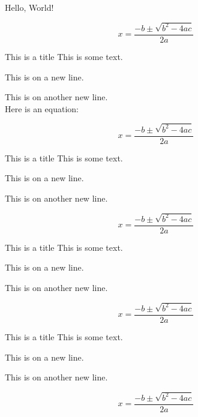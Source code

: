 Hello, World!

\linenumbers

\lipsum[10]


\begin{equation*}
    x = \frac{-b \pm \sqrt{b^2 - 4ac}}{2a}
\end{equation*}

\Blinddocument

\begin{greybox}{This is a title}
    This is some text.

    This is on a new line.

    This is on another new line.\\
    Here is an equation:

    \begin{equation*}
        x = \frac{-b \pm \sqrt{b^2 - 4ac}}{2a}
    \end{equation*}
\end{greybox}

\begin{redbox}{This is a title}
    This is some text.

    This is on a new line.

    This is on another new line.

    \begin{equation*}
        x = \frac{-b \pm \sqrt{b^2 - 4ac}}{2a}
    \end{equation*}
\end{redbox}

\begin{bluebox}{This is a title}
    This is some text.

    This is on a new line.

    This is on another new line.

    \begin{equation*}
        x = \frac{-b \pm \sqrt{b^2 - 4ac}}{2a}
    \end{equation*}
\end{bluebox}

\begin{greenbox}{This is a title}
    \linenumbers
    This is some text.

    This is on a new line.

    This is on another new line.

    \begin{equation*}
        x = \frac{-b \pm \sqrt{b^2 - 4ac}}{2a}
    \end{equation*}
    \nolinenumbers
\end{greenbox}

